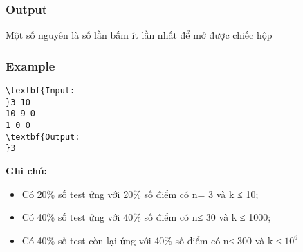 \subsubsection{Output}

Một số nguyên là số lần bấm ít lần nhất để mở được chiếc hộp

\subsubsection{Example}
\begin{verbatim}
\textbf{Input:
}3 10
10 9 0
1 0 0
\textbf{Output:
}3
\end{verbatim}

\textbf{\textbf{Ghi chú:}}
\begin{itemize}
	\item Có 20\% số test ứng với 20\% số điểm có n= 3 và k ≤ 10;
	\item Có 40\% số test ứng với 40\% số điểm có n≤ 30 và k ≤ 1000;
	\item Có 40\% số test còn lại ứng với 40\% số điểm có n≤ 300 và k ≤ $10^{6}$
\end{itemize}
